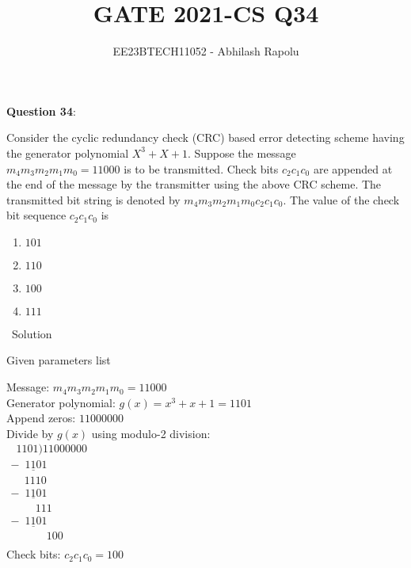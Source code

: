 \documentclass[journal,12pt,twocolumn]{IEEEtran}
\title{GATE 2021-CS Q34}
\author{EE23BTECH11052 - Abhilash Rapolu}
\begin{document}
\maketitle

\textbf {Question 34}:

Consider the cyclic redundancy check (CRC) based error detecting scheme having the generator polynomial $X^3 + X + 1$. Suppose the message $m_4m_3m_2m_1m_0 = 11000$ is to be transmitted. Check bits $c_2c_1c_0$ are appended at the end of the message by the transmitter using the above CRC scheme. The transmitted bit string is denoted by $m_4m_3m_2m_1m_0c_2c_1c_0$. The value of the check bit sequence $c_2c_1c_0$ is

\begin{enumerate}
\item $101$
\item $110$
\item $100$  
\item $111$
\end{enumerate}

\ Solution\\

\begin{table}[htbp]
\centering

\caption{Given parameters list}
\end{table}
Message: $m_4m_3m_2m_1m_0 = 11000$ \\
Generator polynomial: $g(x) = x^3 + x + 1 = 1101$ \\
Append zeros: $11000000$ \\
Divide by $g(x)$ using modulo-2 division:\\
$
\begin{array}{r}
\phantom{1}1101)11000000 \\
-\underline{\phantom{1}1101} \\
\phantom{-}1110 \\
-\underline{\phantom{1}1101} \\
\phantom{-}\phantom{1}\phantom{1}111 \\
-\underline{\phantom{1}1101} \\
\phantom{-}\phantom{1}\phantom{1}\phantom{1}\phantom{1}100 \\
\end{array}
$
\\Check bits: $c_2c_1c_0 = 100$
\end{document}
